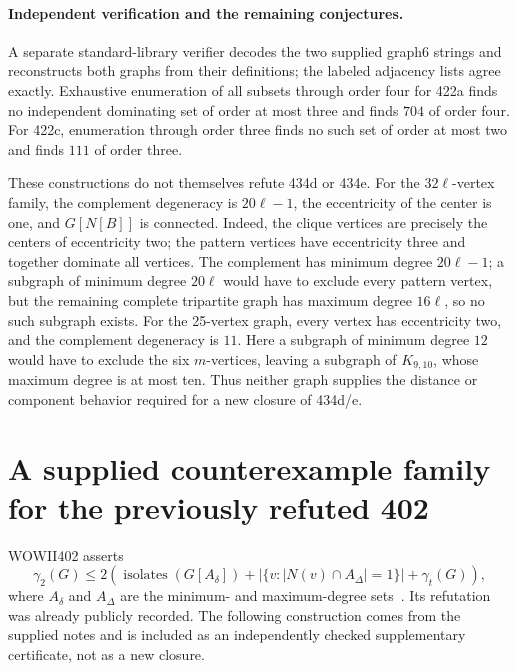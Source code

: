 \documentclass[11pt,a4paper]{article}
\theoremstyle{remark}
\begin{document}
\paragraph{Independent verification and the remaining conjectures.}
A separate standard-library verifier decodes the two supplied graph6
strings and reconstructs both graphs from their definitions; the labeled
adjacency lists agree exactly.  Exhaustive enumeration of all subsets
through order four for 422a finds no independent dominating set of order
at most three and finds $704$ of order four.  For 422c, enumeration through
order three finds no such set of order at most two and finds $111$ of
order three.

These constructions do not themselves refute 434d or 434e.
For the $32\ell$-vertex family, the complement degeneracy is $20\ell-1$,
the eccentricity of the center is one, and $G[N[B]]$ is connected.
Indeed, the clique vertices are precisely the centers of eccentricity
two; the pattern vertices have eccentricity three and together dominate
all vertices.  The complement has minimum degree $20\ell-1$;
a subgraph of minimum degree $20\ell$ would have to exclude every
pattern vertex, but the remaining complete tripartite graph has maximum
degree $16\ell$, so no such subgraph exists.
For the 25-vertex graph, every vertex has eccentricity two, and the
complement degeneracy is $11$.  Here a subgraph of minimum degree $12$
would have to exclude the six $m$-vertices, leaving a subgraph of
$K_{9,10}$, whose maximum degree is at most ten.
Thus neither graph supplies the distance or component behavior required
for a new closure of 434d/e.

\section{A supplied counterexample family for the previously refuted 402}
\label{r7:402}

WOWII402 asserts
\[
 \gamma_2(G)\le2\left(
 \operatorname{isolates}(G[A_\delta])+
 |\{v:|N(v)\cap A_\Delta|=1\}|+\gamma_t(G)\right),
\]
where $A_\delta$ and $A_\Delta$ are the minimum- and maximum-degree
sets~\cite{WOWII}. Its refutation was already publicly recorded.
The following construction comes from the supplied notes and is
included as an independently checked supplementary certificate,
not as a new closure.
\end{document}
